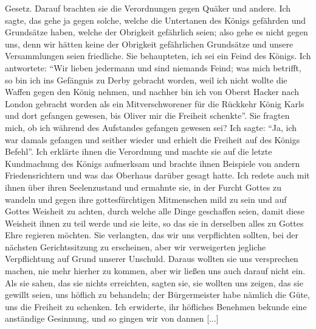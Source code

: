 Gesetz. Darauf brachten sie die Verordnungen gegen Quäker und
andere. Ich sagte, das gehe ja gegen solche, welche die Untertanen 
des Königs gefährden und Grundsätze haben, welche der
Obrigkeit gefährlich seien; also gehe es nicht gegen uns, denn wir
hätten keine der Obrigkeit gefährlichen Grundsätze und unsere
Versammlungen seien friedliche. Sie behaupteten, ich sei ein
Feind des Königs. Ich antwortete: "`Wir lieben jedermann und
sind niemands Feind; was mich betrifft, so bin ich ins Gefängnis 
zu Derby gebracht worden, weil ich nicht wollte die
Waffen gegen den König nehmen, und nachher bin ich von Oberst
Hacker nach London gebracht worden als ein Mitverschworener
für die Rückkehr König Karls und dort gefangen gewesen, bis
Oliver mir die Freiheit schenkte"'. Sie fragten mich, ob ich während
des Aufstandes gefangen gewesen sei? Ich sagte: "`Ja, ich war
damals gefangen und seither wieder und erhielt die Freiheit auf
des Königs Befehl"'. Ich erklärte ihnen die Verordnung und
machte sie auf die letzte Kundmachung des Königs aufmerksam und
brachte ihnen Beispiele von andern Friedensrichtern und was
das Oberhaus darüber gesagt hatte. Ich redete auch mit
ihnen über ihren Seelenzustand und ermahnte sie, in der Furcht
Gottes zu wandeln und gegen ihre gottesfürchtigen Mitmenschen
mild zu sein und auf Gottes Weisheit zu achten, durch welche alle
Dinge geschaffen seien, damit diese Weisheit ihnen zu teil werde
und sie leite, so das sie in derselben alles zu Gottes Ehre
regieren möchten. Sie verlangten, das wir uns verpflichten
sollten, bei der nächsten Gerichtssitzung zu erscheinen, aber wir 
verweigerten jegliche Verpflichtung auf Grund unserer Unschuld. 
Daraus wollten sie uns versprechen machen, nie mehr hierher zu
kommen, aber wir ließen uns auch darauf nicht ein. Als sie sahen,
das sie nichts erreichten, sagten sie, sie wollten uns zeigen, das
sie gewillt seien, uns höflich zu behandeln; der Bürgermeister habe
nämlich die Güte, uns die Freiheit zu schenken. Ich erwiderte,
ihr höfliches Benehmen bekunde eine anständige Gesinnung, und
so gingen wir von dannen [...]

